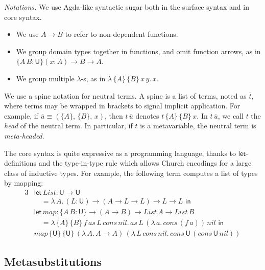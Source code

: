\documentclass[acmsmall,screen,dvipsnames]{acmart}\settopmatter{}
\newcommand{\slet}{\boldsymbol{\mathsf{let}}}
\renewcommand{\sin}{\boldsymbol{\mathsf{in}}}
\renewcommand{\U}{\mathsf{U}}
\newcommand{\mi}[1]{\mathit{#1}}
\theoremstyle{remark}
\begin{document}
\emph{Notations.} We use Agda-like syntactic sugar both in the surface syntax and
in core syntax.
\begin{itemize}
  \item We use $A \to B$ to refer to non-dependent functions.
  \item We group domain types together in functions, and omit function arrows,
    as in $\{A\,B : \U\}(x : A) \to B \to A$.
  \item We group multiple $\lambda$-s, as in $\lambda\,\{A\}\,\{B\}\,x\,y.\,x$.
\end{itemize}
\begin{definition}[Spines]\label{def:spines}
  We use a spine notation for neutral terms. A spine is a list of
  terms, noted as $\overline{t}$, where terms may be wrapped in brackets to
  signal implicit application. For example, if $\overline{u} \equiv
  (\{A\},\,\{B\},\,x)$, then $t\,\overline{u}$ denotes $t\,\{A\}\,\{B\}\,x$.  In
  $t\,\overline{u}$, we call $t$ the \emph{head} of the neutral term. In
  particular, if $t$ is a metavariable, the neutral term is \emph{meta-headed}.
\end{definition}
\begin{example}
The core syntax is quite expressive as a programming language, thanks to
$\slet$-definitions and the
type-in-type rule which allows Church encodings for a large class of inductive
types. For example, the following term computes a list of types by mapping:
\begin{alignat*}{3}
  & \slet\,List : \U\to\U\\
  & \hspace{1em}= \lambda\,A.\,(L : \U)\to(A\to L\to L)\to L\to L\,\,\sin\\
  & \slet\,\mi{map} : \{A\,B : \U\}\to (A \to B) \to \mi{List}\,A \to \mi{List}\,B\\
  & \hspace{1em}=
  \lambda\,\{A\}\,\{B\}\,f\,as\,L\,\mi{cons}\,\mi{nil}.\,as\,L\,(\lambda\,a.\,\mi{cons}\,(f\,a))\,nil\,\,\sin\\
  & \mi{map}\,\{\U\}\,\{\U\}\,(\lambda\,A.\, A \to A)\,(\lambda\,L\,\mi{cons}\,\mi{nil}.\,\mi{cons}\,\U\,(\mi{cons}\,\U\,\mi{nil}))
\end{alignat*}
\end{example}

\subsection{Metasubstitutions}\label{sec:metasubstitutions}
\end{document}
